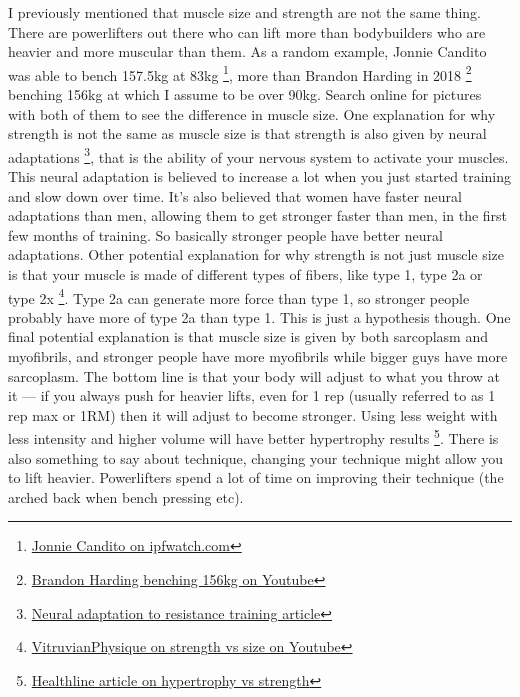 \documentclass[openany, 12pt]{book}
\begin{document}
        I previously mentioned that muscle size and strength are not the same thing. There are powerlifters out there who can lift more than bodybuilders who are heavier and more muscular
        than them. As a random example, Jonnie Candito was able to bench 157.5kg at 83kg
        \footnote{\href{https://www.ipfwatch.com/lifters/jonnie-candito/)}{Jonnie Candito on ipfwatch.com}}, more than Brandon Harding in 2018
        \footnote{\href{https://www.youtube.com/watch?v=UVxsfzE1pag)}{Brandon Harding benching 156kg on Youtube}} benching 156kg at which I assume to be over 90kg. Search online for pictures with both of
        them to see the difference in muscle size.
        One explanation for why strength is not the same as muscle size is that strength is also given by neural adaptations
        \footnote{\href{https://pubmed.ncbi.nlm.nih.gov/3057313/)}{Neural adaptation to resistance training article}}, that is the ability of your nervous system to activate your muscles. This
        neural adaptation is believed to increase a lot when you just started training and slow down over time. It's also believed that women have faster neural adaptations than men, allowing them
        to get stronger faster than men, in the first few months of training. So basically stronger people have better neural adaptations.
        Other potential explanation for why strength is not just muscle size is that your muscle is made of different types of fibers, like type 1, type 2a or type 2x
        \footnote{\href{https://www.youtube.com/watch?v=eU-fFi0D8Es)}{VitruvianPhysique on strength vs size on Youtube}}. Type 2a can generate more force than type 1, so stronger people probably
        have more of type 2a than type 1. This is just a hypothesis though.
        One final potential explanation is that muscle size is given by both sarcoplasm and myofibrils, and stronger people have more myofibrils while bigger guys have
        more sarcoplasm. The bottom line is that your body will adjust to what you throw at it --- if you always push for heavier lifts, even for 1 rep (usually referred to as 1 rep max or 1RM) then it
        will adjust to become stronger. Using less weight with less intensity and higher volume will have better hypertrophy results
        \footnote{\href{https://www.healthline.com/health/exercise-fitness/hypertrophy-vs-strength)}{Healthline article on hypertrophy vs strength}}. There is also something to say about technique,
        changing your technique might allow you to lift heavier. Powerlifters spend a lot of time on improving their technique (the arched back when bench pressing etc).
\end{document}
